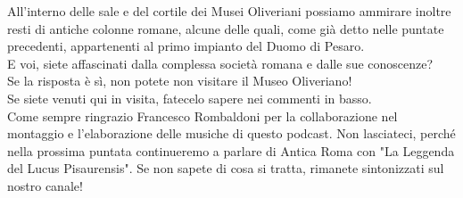 \documentclass[hidelinks,12pt,a4paper]{article}
\begin{document}
\begin{flushleft}
		All'interno delle sale e del cortile dei Musei Oliveriani possiamo ammirare inoltre resti di antiche colonne romane, alcune delle quali, come già detto nelle puntate precedenti, appartenenti al primo impianto del Duomo di Pesaro.\\
		E voi, siete affascinati dalla complessa società romana e dalle sue conoscenze?\\
		Se la risposta è sì, non potete non visitare il Museo Oliveriano!\\
		Se siete venuti qui in visita, fatecelo sapere nei commenti in basso.\\
		Come sempre ringrazio Francesco Rombaldoni per la collaborazione nel montaggio e l'elaborazione delle musiche di questo podcast. Non lasciateci, perché nella prossima puntata continueremo a parlare di Antica Roma con "La Leggenda del Lucus Pisaurensis". Se non sapete di cosa si tratta, rimanete sintonizzati sul nostro canale!\\
		

\end{flushleft}
\end{document}
